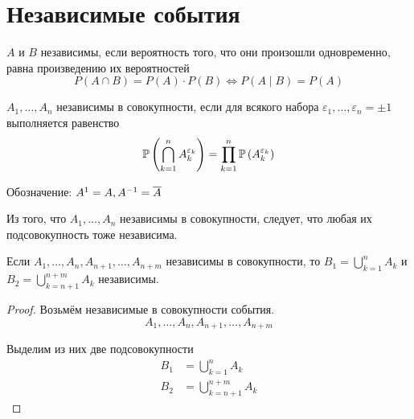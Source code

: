 \section{Независимые события}
\begin{definition} $A$ и $B$ независимы, если вероятность того,
    что они произошли одновременно, равна произведению их вероятностей
    $$P\left(A\cap B\right)
    =P\left(A\right)\cdot P\left(B\right)\Leftrightarrow P\left(A\mid B\right)
    =P\left(A\right)$$
\end{definition}
\begin{definition} $A_1, \dots, A_n$ независимы в совокупности,
    если для всякого набора $\varepsilon_1, \dots, \varepsilon_n=\pm 1$
    выполняется равенство
    $$\mathbb{P}\left( \bigcap_{k=1}^n A_{k}^{\varepsilon_k} \right)
    =\prod_{k=1}^n \mathbb{P}\left( A_{k}^{\varepsilon_k} \right)$$

    Обозначение: $A^1=A, A^{-1}=\overline{A}$
\end{definition}
\begin{affirmation}
    Из того, что $A_1, \dots, A_n$ независимы в совокупности,
    следует, что любая их подсовокупность тоже независима.
\end{affirmation}
\begin{affirmation}
    Если $A_1, \dots, A_n, A_{n+1}, \dots, A_{n+m}$ независимы в совокупности,
    то $B_1=\bigcup_{k=1}^n A_k$ и $B_2=\bigcup_{k=n+1}^{n+m} A_k$ независимы.
\end{affirmation}
\begin{proof}
    Возьмём независимые в совокупности события.
    $$A_1, \dots, A_n, A_{n+1}, \dots, A_{n+m}$$
    
    Выделим из них две подсовокупности
    \begin{align*}
    B_1&=\bigcup_{k=1}^n A_k\\
    B_2&=\bigcup_{k=n+1}^{n+m} A_k
    \end{align*}
\end{proof}
